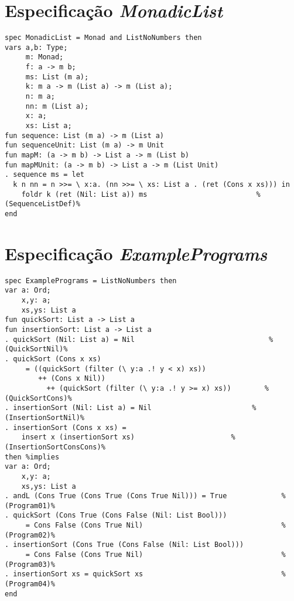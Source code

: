 \section{Especificação \textit{MonadicList}}
\label{appendix:strictSpec:monadicList}
\begin{Verbatim}
spec MonadicList = Monad and ListNoNumbers then
vars a,b: Type;
     m: Monad;
     f: a -> m b;
     ms: List (m a);
     k: m a -> m (List a) -> m (List a);
     n: m a;
     nn: m (List a);
     x: a;
     xs: List a;
fun sequence: List (m a) -> m (List a)
fun sequenceUnit: List (m a) -> m Unit
fun mapM: (a -> m b) -> List a -> m (List b)
fun mapMUnit: (a -> m b) -> List a -> m (List Unit)
. sequence ms = let
  k n nn = n >>= \ x:a. (nn >>= \ xs: List a . (ret (Cons x xs))) in
    foldr k (ret (Nil: List a)) ms                          %(SequenceListDef)%
end
\end{Verbatim}

\section{Especificação \textit{ExamplePrograms}}
\label{appendix:strictSpec:examplePrograms}
\begin{Verbatim}
spec ExamplePrograms = ListNoNumbers then
var a: Ord;
    x,y: a;
    xs,ys: List a
fun quickSort: List a -> List a
fun insertionSort: List a -> List a
. quickSort (Nil: List a) = Nil                                %(QuickSortNil)%
. quickSort (Cons x xs) 
     = ((quickSort (filter (\ y:a .! y < x) xs)) 
        ++ (Cons x Nil))
          ++ (quickSort (filter (\ y:a .! y >= x) xs))        %(QuickSortCons)%
. insertionSort (Nil: List a) = Nil                        %(InsertionSortNil)%
. insertionSort (Cons x xs) =
    insert x (insertionSort xs)                       %(InsertionSortConsCons)%
then %implies
var a: Ord;
    x,y: a;
    xs,ys: List a
. andL (Cons True (Cons True (Cons True Nil))) = True             %(Program01)%
. quickSort (Cons True (Cons False (Nil: List Bool))) 
     = Cons False (Cons True Nil)                                 %(Program02)%
. insertionSort (Cons True (Cons False (Nil: List Bool))) 
     = Cons False (Cons True Nil)                                 %(Program03)%
. insertionSort xs = quickSort xs                                 %(Program04)%
end
\end{Verbatim}

